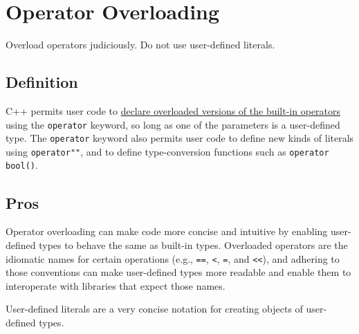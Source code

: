 
\section{Operator Overloading}\label{sec:operator-overloading}
Overload operators judiciously. Do not use user-defined literals.

\subsection{Definition}
C++ permits user code to \href{http://en.cppreference.com/w/cpp/language/operators}{declare overloaded versions of the built-in operators} using the \texttt{operator} keyword, so long as one of the parameters is a user-defined type. The \texttt{operator} keyword also permits user code to define new kinds of literals using \texttt{operator""}, and to define type-conversion functions such as \texttt{operator bool()}.

\subsection{Pros}
Operator overloading can make code more concise and intuitive by enabling user-defined types to behave the same as built-in types. Overloaded operators are the idiomatic names for certain operations (e.g., \texttt{==}, \texttt{<}, \texttt{=}, and \texttt{<<}), and adhering to those conventions can make user-defined types more readable and enable them to interoperate with libraries that expect those names.

User-defined literals are a very concise notation for creating objects of user-defined types.

